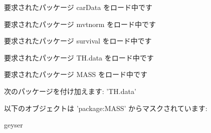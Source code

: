 \begin{Schunk}
\begin{Soutput}
要求されたパッケージ carData をロード中です
\end{Soutput}
\begin{Soutput}
要求されたパッケージ mvtnorm をロード中です
\end{Soutput}
\begin{Soutput}
要求されたパッケージ survival をロード中です
\end{Soutput}
\begin{Soutput}
要求されたパッケージ TH.data をロード中です
\end{Soutput}
\begin{Soutput}
要求されたパッケージ MASS をロード中です
\end{Soutput}
\begin{Soutput}

次のパッケージを付け加えます: 'TH.data'
\end{Soutput}
\begin{Soutput}
以下のオブジェクトは 'package:MASS' からマスクされています:

    geyser
\end{Soutput}
\end{Schunk}
